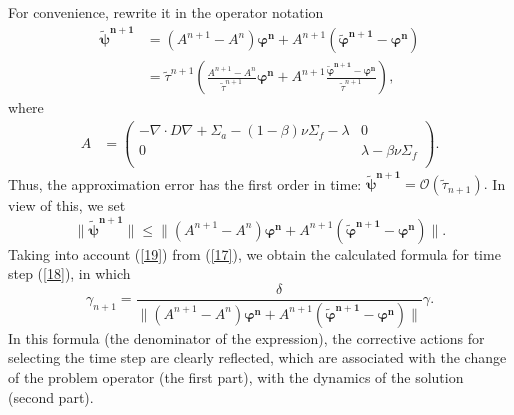 \documentclass[runningheads]{llncs}
\begin{document}
For convenience, rewrite it in the operator notation
\[
\begin{split}
\bm{\widetilde{\psi}^{n+1}} &= (A^{n+1} - A^n)\bm{\varphi^n} + {A}^{n+1}(\bm{\widetilde{\varphi}^{n+1}} - \bm{\varphi^n}) \\
&= \widetilde{\tau}^{n+1} \left( \frac{A^{n+1} - A^n}{\widetilde{\tau}^{n+1}} \bm{\varphi^n} + A^{n+1} \frac{\bm{\widetilde{\varphi}^{n+1}} - \bm{\varphi^n}}{\widetilde{\tau}^{n+1}} \right),
\end{split}
\]
where 
\[
\begin{split}
A &= \begin{pmatrix}
  - \nabla \cdot D \nabla  + \Sigma_{a}  - (1-\beta) \nu \Sigma_{f} - \lambda & 0  \\
  0  & \lambda - \beta\nu\Sigma_f   \\
 \end{pmatrix}.
\end{split} 
\]
Thus, the approximation error has the first order in
time:
$
\bm{\widetilde{\psi}^{n+1}} = \mathcal{O} (\widetilde{\tau}_{n+1}).
$
In view of this, we set 
\begin{equation}\label{19}
 \|\bm{\widetilde{\psi}^{n+1}} \| \leq \| (A^{n+1} - A^n) \bm{\varphi^n} +
 A^{n+1} (\bm{\widetilde{\varphi}^{n+1}} - \bm{\varphi^n}) \| .
\end{equation} 
Taking into account (\ref{19})  from (\ref{17}), we obtain the calculated formula for time step (\ref{18}), in which
\begin{equation}\label{20}
  \gamma_{n+1} = \frac{\delta}{ \| (A^{n+1} - A^n) \bm{\varphi^n}  +
  A^{n+1} (\bm{\widetilde{\varphi}^{n+1}} - \bm{\varphi^n}) \| } \gamma .
\end{equation}
In this formula (the denominator of the expression), the corrective actions for selecting the time step are clearly reflected, which are associated with the change of the problem operator (the first part), with the dynamics of the solution (second part).
\end{document}
